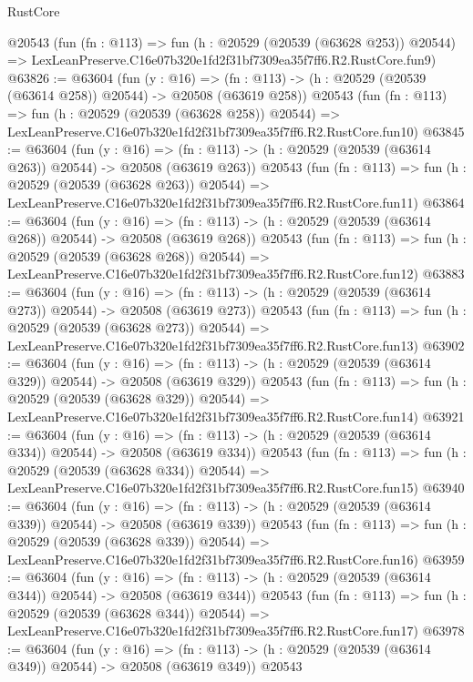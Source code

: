 \begin{lexlean}{RustCore}
\begin{coremodule}
    @20543
    (fun (fn : @113) =>
    fun (h : @20529 (@20539 (@63628 @253)) @20544) =>
    LexLeanPreserve.C16e07b320e1fd2f31bf7309ea35f7ff6.R2.RustCore.fun9)
@63826 := @63604
    (fun (y : @16) =>
    (fn : @113) -> (h : @20529 (@20539 (@63614 @258)) @20544) -> @20508 (@63619 @258))
    @20543
    (fun (fn : @113) =>
    fun (h : @20529 (@20539 (@63628 @258)) @20544) =>
    LexLeanPreserve.C16e07b320e1fd2f31bf7309ea35f7ff6.R2.RustCore.fun10)
@63845 := @63604
    (fun (y : @16) =>
    (fn : @113) -> (h : @20529 (@20539 (@63614 @263)) @20544) -> @20508 (@63619 @263))
    @20543
    (fun (fn : @113) =>
    fun (h : @20529 (@20539 (@63628 @263)) @20544) =>
    LexLeanPreserve.C16e07b320e1fd2f31bf7309ea35f7ff6.R2.RustCore.fun11)
@63864 := @63604
    (fun (y : @16) =>
    (fn : @113) -> (h : @20529 (@20539 (@63614 @268)) @20544) -> @20508 (@63619 @268))
    @20543
    (fun (fn : @113) =>
    fun (h : @20529 (@20539 (@63628 @268)) @20544) =>
    LexLeanPreserve.C16e07b320e1fd2f31bf7309ea35f7ff6.R2.RustCore.fun12)
@63883 := @63604
    (fun (y : @16) =>
    (fn : @113) -> (h : @20529 (@20539 (@63614 @273)) @20544) -> @20508 (@63619 @273))
    @20543
    (fun (fn : @113) =>
    fun (h : @20529 (@20539 (@63628 @273)) @20544) =>
    LexLeanPreserve.C16e07b320e1fd2f31bf7309ea35f7ff6.R2.RustCore.fun13)
@63902 := @63604
    (fun (y : @16) =>
    (fn : @113) -> (h : @20529 (@20539 (@63614 @329)) @20544) -> @20508 (@63619 @329))
    @20543
    (fun (fn : @113) =>
    fun (h : @20529 (@20539 (@63628 @329)) @20544) =>
    LexLeanPreserve.C16e07b320e1fd2f31bf7309ea35f7ff6.R2.RustCore.fun14)
@63921 := @63604
    (fun (y : @16) =>
    (fn : @113) -> (h : @20529 (@20539 (@63614 @334)) @20544) -> @20508 (@63619 @334))
    @20543
    (fun (fn : @113) =>
    fun (h : @20529 (@20539 (@63628 @334)) @20544) =>
    LexLeanPreserve.C16e07b320e1fd2f31bf7309ea35f7ff6.R2.RustCore.fun15)
@63940 := @63604
    (fun (y : @16) =>
    (fn : @113) -> (h : @20529 (@20539 (@63614 @339)) @20544) -> @20508 (@63619 @339))
    @20543
    (fun (fn : @113) =>
    fun (h : @20529 (@20539 (@63628 @339)) @20544) =>
    LexLeanPreserve.C16e07b320e1fd2f31bf7309ea35f7ff6.R2.RustCore.fun16)
@63959 := @63604
    (fun (y : @16) =>
    (fn : @113) -> (h : @20529 (@20539 (@63614 @344)) @20544) -> @20508 (@63619 @344))
    @20543
    (fun (fn : @113) =>
    fun (h : @20529 (@20539 (@63628 @344)) @20544) =>
    LexLeanPreserve.C16e07b320e1fd2f31bf7309ea35f7ff6.R2.RustCore.fun17)
@63978 := @63604
    (fun (y : @16) =>
    (fn : @113) -> (h : @20529 (@20539 (@63614 @349)) @20544) -> @20508 (@63619 @349))
    @20543

\end{coremodule}
\end{lexlean}
